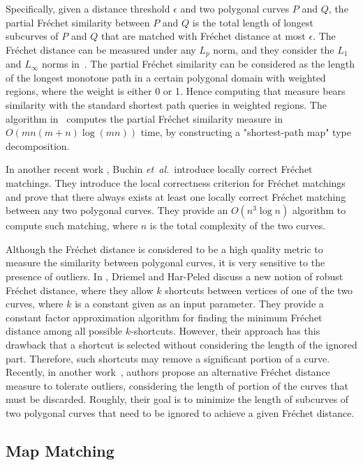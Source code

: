 \documentclass[12pt]{dalthesis}
\newcommand{\etal}{{\em et~al.\/}}
\newcommand{\Frechet}{Fr\'echet }
\begin{document}
Specifically, given a distance threshold $\epsilon$ and two polygonal 
curves $P$ and $Q$, the partial \Frechet similarity between $P$ and $Q$ is the total length
of longest subcurves of $P$ and $Q$ that are matched with
\Frechet distance at most $\epsilon$. The \Frechet distance 
can be measured under any $L_p$ norm, and they consider the $L_1$ and
$L_\infty$ norms in~\cite{ExactPartial}.
The partial \Frechet similarity can be considered as
the length of the longest monotone path in a certain
polygonal domain with weighted regions, where the
weight is either 0 or 1. Hence computing that measure
bears similarity with the standard shortest path queries
in weighted regions. The algorithm in~\cite{ExactPartial} computes 
the partial \Frechet similarity measure in $O(mn(m + n) \log(mn))$ time, by constructing a "shortest-path map" type decomposition.

In another recent work \cite{BuchinLocallyFrechet}, 
Buchin \etal~introduce locally correct \Frechet matchings. They introduce the local correctness criterion for \Frechet matchings and prove
that there always exists at least one locally correct \Frechet matching between any
two polygonal curves. They provide an 
$O(n^3 \log n)$ algorithm to compute
such matching, where
$n$ is the total complexity of the two curves.


Although the \Frechet distance is considered to be a high quality metric to measure
the similarity between polygonal curves, it is very sensitive to the presence of outliers. 
In \cite{Jaywalking}, Driemel and Har-Peled
discuss a new notion of robust \Frechet distance, 
where they allow $k$ shortcuts between vertices of one
of the two curves, where $k$ 
is a constant given as an input parameter.
They provide a constant factor
approximation algorithm for finding the minimum 
\Frechet distance among all possible $k$-shortcuts.
However, their approach has this 
drawback that a shortcut is selected without considering the length of the ignored part. Therefore, such shortcuts may remove a significant portion of a curve.
Recently, in another work~\cite{SackAminPaper}, 
authors propose
an alternative \Frechet distance measure to tolerate outliers,
considering the length of portion of the curves that must 
be discarded. Roughly, their goal is to minimize the length of 
subcurves of two polygonal curves that need to be ignored to achieve a given  \Frechet distance.


\subsection{Map Matching}
\label{sec:RelatedMapMatching}
\end{document}

